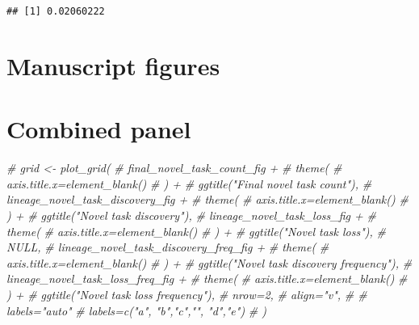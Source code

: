 \documentclass[]{book}
\newenvironment{Shaded}{\begin{snugshade}}{\end{snugshade}}
\newcommand{\CommentTok}[1]{\textcolor[rgb]{0.56,0.35,0.01}{\textit{#1}}}
\begin{document}
\begin{verbatim}
## [1] 0.02060222
\end{verbatim}

\hypertarget{manuscript-figures-1}{%
\section{Manuscript figures}\label{manuscript-figures-1}}

\hypertarget{combined-panel}{%
\section{Combined panel}\label{combined-panel}}

\begin{Shaded}
\begin{Highlighting}[]
\CommentTok{# grid <- plot_grid(}
\CommentTok{#   final_novel_task_count_fig +}
\CommentTok{#     theme(}
\CommentTok{#       axis.title.x=element_blank()}
\CommentTok{#     ) +}
\CommentTok{#     ggtitle("Final novel task count"),}
\CommentTok{#   lineage_novel_task_discovery_fig +}
\CommentTok{#     theme(}
\CommentTok{#       axis.title.x=element_blank()}
\CommentTok{#     ) +}
\CommentTok{#     ggtitle("Novel task discovery"),}
\CommentTok{#   lineage_novel_task_loss_fig +}
\CommentTok{#     theme(}
\CommentTok{#       axis.title.x=element_blank()}
\CommentTok{#     ) +}
\CommentTok{#     ggtitle("Novel task loss"),}
\CommentTok{#   NULL,}
\CommentTok{#   lineage_novel_task_discovery_freq_fig +}
\CommentTok{#     theme(}
\CommentTok{#       axis.title.x=element_blank()}
\CommentTok{#     ) +}
\CommentTok{#     ggtitle("Novel task discovery frequency"),}
\CommentTok{#   lineage_novel_task_loss_freq_fig +}
\CommentTok{#     theme(}
\CommentTok{#       axis.title.x=element_blank()}
\CommentTok{#     ) +}
\CommentTok{#     ggtitle("Novel task loss frequency"),}
\CommentTok{#   nrow=2,}
\CommentTok{#   align="v",}
\CommentTok{#   # labels="auto"}
\CommentTok{#   labels=c("a", "b","c","", "d","e")}
\CommentTok{# )}


\end{Highlighting}
\end{Shaded}
\end{document}

